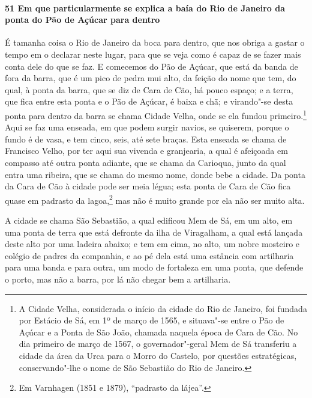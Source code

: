 \begin{linenumbers}
\paragraph{51 Em que particularmente se explica a baía do Rio de Janeiro da ponta do Pão
de Açúcar para dentro} \quad
É tamanha coisa o Rio de Janeiro da boca para dentro, que nos obriga a gastar o tempo em o
declarar neste lugar, para que se veja como é capaz de se fazer mais conta dele do que se
faz. E comecemos do Pão de Açúcar, que está da banda de fora da barra, que é um pico de
pedra mui alto, da feição do nome que tem, do qual, à ponta da barra, que se diz de Cara
de Cão, há pouco espaço; e a terra, que fica entre esta ponta e o Pão de Açúcar, é baixa e
chã; e virando"-se desta ponta para dentro da barra se chama Cidade Velha, onde se ela
fundou primeiro.\footnote{ A Cidade Velha, considerada o início da cidade do Rio de
Janeiro, foi fundada por Estácio de Sá, em 1º de março de 1565, e situava"-se entre o Pão
de Açúcar e a Ponta de São João, chamada naquela época de Cara de Cão. No dia primeiro de
março de 1567, o governador"-geral Mem de Sá transferiu a cidade da área da Urca para o
Morro do Castelo, por questões estratégicas, conservando"-lhe o nome de São Sebastião do
Rio de Janeiro.} Aqui se faz uma enseada, em que podem surgir navios, se quiserem, porque
o fundo é de vasa, e tem cinco, seis, até sete braças. Esta enseada se chama de Francisco
Velho, por ter aqui sua vivenda e granjearia, a qual é afeiçoada em compasso até outra
ponta adiante, que se chama da Carioqua, junto da qual entra uma ribeira, que se chama do
mesmo nome, donde bebe a cidade. Da ponta da Cara de Cão à cidade pode ser meia légua;
esta ponta de Cara de Cão fica quase em padrasto da lagoa,\footnote{ Em Varnhagen (1851 e
1879), ``padrasto da lájea''.} mas não é muito grande por ela não ser muito alta.

A cidade se chama São Sebastião, a qual edificou Mem de Sá, em um alto, em uma ponta de
terra que está defronte da ilha de Viragalham, a qual está lançada deste alto por uma
ladeira abaixo; e tem em cima, no alto, um nobre mosteiro e colégio de padres da
companhia, e ao pé dela está uma estância com artilharia para uma banda e para outra, um
modo de fortaleza em uma ponta, que defende o porto, mas não a barra, por lá não chegar
bem a artilharia.


\end{linenumbers}
